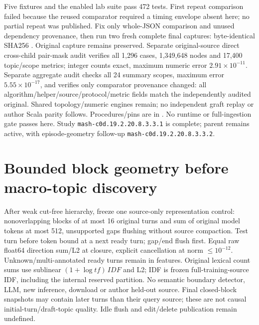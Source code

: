 \documentclass[11pt]{article}
\begin{document}
Five fixtures and the enabled lab suite pass 472 tests. First repeat comparison
failed because the reused comparator required a timing envelope absent here;
no partial repeat was published. Fix only whole-JSON comparison and unused
dependency provenance, then run two fresh complete final captures: byte-identical
SHA256 .
Original capture remains preserved. Separate original-source direct cross-child
pair-mask audit verifies all 1,296 cases, 1,349,648 nodes and 17,400 topic/scope
metrics; integer counts exact, maximum numeric error $2.91\times10^{-11}$.
Separate aggregate audit checks all 24 summary scopes, maximum error
$5.55\times10^{-17}$, and verifies only comparator provenance changed: all
algorithm/helper/source/protocol/metric fields match the independently audited
original. Shared topology/numeric engines remain; no independent graft replay or
author Scala parity follows. Procedures/pins are in
. No runtime or full-ingestion gate
passes here. Study \texttt{mash-c0d.19.2.20.8.3.3.1} is complete; parent remains
active, with episode-geometry follow-up \texttt{mash-c0d.19.2.20.8.3.3.2}.

\section{Bounded block geometry before macro-topic discovery}
After weak cut-free hierarchy, freeze one source-only representation control:
nonoverlapping blocks of at most 16 original turns and sum of original model
tokens at most 512, unsupported gaps flushing without source compaction. Test
turn before token bound at a next ready turn; gap/end flush first. Equal raw
float64 direction sum/L2 at closure, explicit cancellation at norm $\le10^{-12}$.
Unknown/multi-annotated ready turns remain in features. Original lexical count
sums use sublinear $(1+\log tf)\,IDF$ and L2; IDF is frozen full-training-source
IDF, including the internal reserved partition. No semantic boundary detector,
LLM, new inference, download or author held-out source. Final closed-block
snapshots may contain later turns than their query source; these are not causal
initial-turn/draft-topic quality. Idle flush and edit/delete publication remain
undefined.
\end{document}
